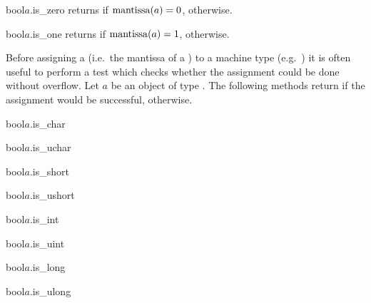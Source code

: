 \begin{cfcode}{bool}{$a$.is_zero}{}
  returns \TRUE if $\operatorname{mantissa}(a) = 0$, \FALSE otherwise.
\end{cfcode}

\begin{cfcode}{bool}{$a$.is_one}{}
  returns \TRUE if $\operatorname{mantissa}(a) = 1$, \FALSE otherwise.
\end{cfcode}



\TYPE

Before assigning a  (i.e.~the mantissa of a ) to a machine
type (e.g.~) it is often useful to perform a test which checks whether the assignment
could be done without overflow.  Let $a$ be an object of type .  The
following methods return \TRUE if the assignment would be successful, \FALSE otherwise.

\begin{cfcode}{bool}{$a$.is_char}{}\end{cfcode}
\begin{cfcode}{bool}{$a$.is_uchar}{}\end{cfcode}
\begin{cfcode}{bool}{$a$.is_short}{}\end{cfcode}
\begin{cfcode}{bool}{$a$.is_ushort}{}\end{cfcode}
\begin{cfcode}{bool}{$a$.is_int}{}\end{cfcode}
\begin{cfcode}{bool}{$a$.is_uint}{}\end{cfcode}
\begin{cfcode}{bool}{$a$.is_long}{}\end{cfcode}
\begin{cfcode}{bool}{$a$.is_ulong}{}\end{cfcode}

